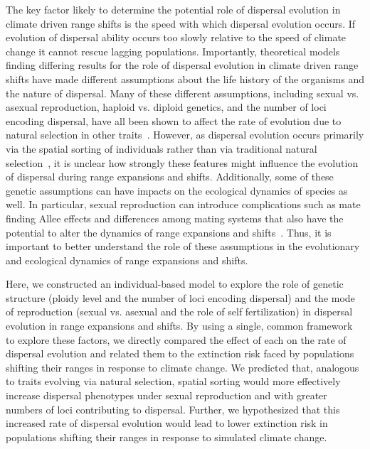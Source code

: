 \documentclass[11pt]{article}
\begin{document}
The key factor likely to determine the potential role of dispersal evolution in climate driven range shifts is the speed with which dispersal evolution occurs. If evolution of dispersal ability occurs too slowly relative to the speed of climate change it cannot rescue lagging populations. Importantly, theoretical models finding differing results for the role of dispersal evolution in climate driven range shifts have made different assumptions about the life history of the organisms and the nature of dispersal. Many of these different assumptions, including sexual vs. asexual reproduction, haploid vs. diploid genetics, and the number of loci encoding dispersal, have all been shown to affect the rate of evolution due to natural selection in other traits~\citep{orr1994does, zeyl2003evolutionary, goddard2005sex, pritchard2010genetics}. However, as dispersal evolution occurs primarily via the spatial sorting of individuals rather than via traditional natural selection~\citep{shine2011evolutionary}, it is unclear how strongly these features might influence the evolution of dispersal during range expansions and shifts. Additionally, some of these genetic assumptions can have impacts on the ecological dynamics of species as well. In particular, sexual reproduction can introduce complications such as mate finding Allee effects and differences among mating systems that also have the potential to alter the dynamics of range expansions and shifts~\citep{shaw2015dispersal}. Thus, it is important to better understand the role of these assumptions in the evolutionary and ecological dynamics of range expansions and shifts.

Here, we constructed an individual-based model to explore the role of genetic structure (ploidy level and the number of loci encoding dispersal) and the mode of reproduction (sexual vs. asexual and the role of self fertilization) in dispersal evolution in range expansions and shifts. By using a single, common framework to explore these factors, we directly compared the effect of each on the rate of dispersal evolution and related them to the extinction risk faced by populations shifting their ranges in response to climate change. We predicted that, analogous to traits evolving via natural selection, spatial sorting would more effectively increase dispersal phenotypes under sexual reproduction and with greater numbers of loci contributing to dispersal. Further, we hypothesized that this increased rate of dispersal evolution would lead to lower extinction risk in populations shifting their ranges in response to simulated climate change.
\end{document}
